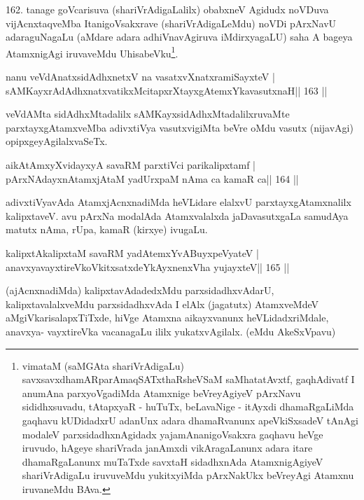 \begin{artha}
162. tanage goVcarisuva (shariVrAdigaLalilx) obabxneV Agidudx noVDuva  vijAcnxtaqveMba ItanigoVsakxrave (shariVrAdigaLeMdu) noVDi pArxNavU adara\break guNagaLu (aMdare adara adhiVnavAgiruva iMdirxyagaLU) saha A bageya AtamxnigAgi iruvaveMdu UhisabeVku\footnote{vimataM (saMGAta shariVrAdigaLu) savxsavxdhamARparAmaqSATxthaRsheVSaM saMhatatAvxtf, gaqhAdivatf  \mdash  I anumAna parxyoVgadiMda Atamxnige beVreyAgiyeV pArxNavu sididhxsuvadu, tAtapxyaR - huTuTx, beLavaNige - itAyxdi dhamaRgaLiMda gaqhavu kUDidadxrU adanUnx adara dhamaRvanunx apeVkiSxsadeV tAnAgi modaleV parxsidadhxnAgidadx yajamAnanigoVsakxra gaqhavu heVge iruvudo, hAgeye shariVrada janAmxdi vikAragaLanunx adara itare dhamaRgaLanunx muTaTxde savxtaH sidadhxnAda AtamxnigAgiyeV shariVrAdigaLu iruvuveMdu yukitxyiMda pArxNakUkx beVreyAgi Atamxnu iruvaneMdu BAva.}.
\end{artha}


\begin{shl}
nanu veVdAnatxsidAdhxnetxV na vasatxvXnatxramiSayxteV |
sAMKayxrAdAdhxnatxvatikxMcitapxrXtayxgAtemxYkavasutxnaH\hfill || 163 ||
\end{shl}

\begin{artha}
veVdAMta sidAdhxMtadalilx sAMKayxsidAdhxMtadalilxruvaMte  parxtayxgAtamxveMba adivxtiVya vasutxvigiMta beVre oMdu vasutx (nijavAgi) opipxgeyAgilalxvaSeTx.
\end{artha}

\begin{shl}
aikAtAmxyXvidayxyA savaRM parxtiVci parikalipxtamf |
pArxNAdayxnAtamxjAtaM yadUrxpaM nAma ca kamaR ca\hfill || 164 ||
\end{shl}

\begin{artha}
adivxtiVyavAda AtamxjAcnxnadiMda heVLidare elalxvU parxtayxgAtamxnalilx  kalipxtaveV. avu pArxNa modalAda Atamxvalalxda jaDavasutxgaLa samudAya matutx nAma, rUpa, kamaR (kirxye) ivugaLu.
\end{artha}

\begin{shl}
kalipxtAkalipxtaM savaRM yadA\s\s temxYvABuyxpeVyateV |
anavxyavayxtireVkoVkitxsatxdeYkAyxnenxVha yujayxteV\hfill || 165 ||
\end{shl}

\begin{artha}
(ajAcnxnadiMda) kalipxtavAdadedxMdu parxsidadhxvAdarU, 
kalipxtavalalxveMdu parxsidadhxvAda I elAlx (jagatutx) AtamxveMdeV aMgiVkarisalapxTiTxde, hiVge Atamxna aikayxvanunx heVLidadxriMdale, anavxya- vayxtireVka vacanagaLu ililx yukatxvAgilalx. (eMdu AkeSxVpavu)
\end{artha}

